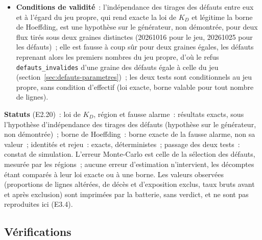 \documentclass[a4paper,11pt]{article}
\newcommand{\code}[1]{\texttt{\small #1}}
\begin{document}
\begin{itemize}[leftmargin=*, itemsep=2pt]
    propre, chaque ligne éligible est altérée par un tirage uniforme
    indépendant, au taux déclaré pour sa cause de sortie (l'exclusion
    exacte des lignes altérées par le moteur relève des identités exactes
    ci-dessus, non de ces deux tests).
  \item \textbf{Conditions de validité}~: l'indépendance des tirages des
    défauts entre eux et à l'égard du jeu propre, qui rend exacte la loi
    de $K_D$ et légitime la borne de Hoeffding, est une hypothèse sur le
    générateur, non démontrée, pour deux flux tirés sous deux graines
    distinctes (20261016 pour le jeu, 20261025 pour les défauts)~; elle est
    fausse à coup sûr pour deux graines égales, les défauts reprenant
    alors les premiers nombres du jeu propre, d'où le refus
    \code{defauts\_invalides} d'une graine des défauts égale à celle du jeu
    (section~\ref{sec:defauts-parametres})~; les deux tests sont
    conditionnels au jeu propre, sans condition d'effectif (loi exacte,
    borne valable pour tout nombre de lignes).
\end{itemize}

\noindent
\textbf{Statuts} (E2.20)~: loi de $K_D$, région et fausse alarme~:
résultats exacts, sous l'hypothèse d'indépendance des tirages des défauts
(hypothèse sur le générateur, non démontrée)~; borne de Hoeffding~: borne exacte de la fausse alarme,
non sa valeur~; identités et rejeu~: exacts, déterministes~; passage des
deux tests~: constat de simulation. L'erreur Monte-Carlo est celle de la
sélection des défauts, mesurée par les régions~; aucune erreur
d'estimation n'intervient, les décomptes étant comparés à leur loi exacte
ou à une borne. Les valeurs observées (proportions de lignes altérées, de
décès et d'exposition exclus, taux bruts avant et après exclusion) sont
imprimées par la batterie, sans verdict, et ne sont pas reproduites ici
(E3.4).

\subsection{Vérifications}
\label{sec:verifications-simulation}
\end{document}
